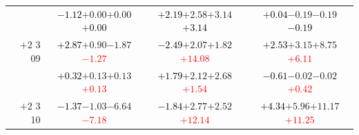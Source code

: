 \documentclass[compress]{beamer}
\begin{document}
\begin{frame}
\begin{tabular}{r | c | c | c}
          & \textcolor{black}{$-1.12$}\hspace{0.1 cm}$+0.00$\hspace{0.1 cm}$+0.00$\hspace{0.1 cm}\textcolor{black}{$+0.00$} & \textcolor{black}{$+2.19$}\hspace{0.1 cm}$+2.58$\hspace{0.1 cm}$+3.14$\hspace{0.1 cm}\textcolor{black}{$+3.14$} & \textcolor{black}{$+0.04$}\hspace{0.1 cm}$-0.19$\hspace{0.1 cm}$-0.19$\hspace{0.1 cm}\textcolor{black}{$-0.19$} \\
$+$2 3 09 & \textcolor{black}{$+2.87$}\hspace{0.1 cm}$+0.90$\hspace{0.1 cm}$-1.87$\hspace{0.1 cm}\textcolor{red}{$-1.27$} & \textcolor{black}{$-2.49$}\hspace{0.1 cm}$+2.07$\hspace{0.1 cm}$+1.82$\hspace{0.1 cm}\textcolor{red}{$+14.08$} & \textcolor{black}{$+2.53$}\hspace{0.1 cm}$+3.15$\hspace{0.1 cm}$+8.75$\hspace{0.1 cm}\textcolor{red}{$+6.11$} \\
          & \textcolor{black}{$+0.32$}\hspace{0.1 cm}$+0.13$\hspace{0.1 cm}$+0.13$\hspace{0.1 cm}\textcolor{red}{$+0.13$} & \textcolor{black}{$+1.79$}\hspace{0.1 cm}$+2.12$\hspace{0.1 cm}$+2.68$\hspace{0.1 cm}\textcolor{red}{$+1.54$} & \textcolor{black}{$-0.61$}\hspace{0.1 cm}$-0.02$\hspace{0.1 cm}$-0.02$\hspace{0.1 cm}\textcolor{red}{$+0.42$} \\
$+$2 3 10 & \textcolor{black}{$-1.37$}\hspace{0.1 cm}$-1.03$\hspace{0.1 cm}$-6.64$\hspace{0.1 cm}\textcolor{red}{$-7.18$} & \textcolor{black}{$-1.84$}\hspace{0.1 cm}$+2.77$\hspace{0.1 cm}$+2.52$\hspace{0.1 cm}\textcolor{red}{$+12.14$} & \textcolor{black}{$+4.34$}\hspace{0.1 cm}$+5.96$\hspace{0.1 cm}$+11.17$\hspace{0.1 cm}\textcolor{red}{$+11.25$} \\

\end{tabular}
\end{frame}
\end{document}

